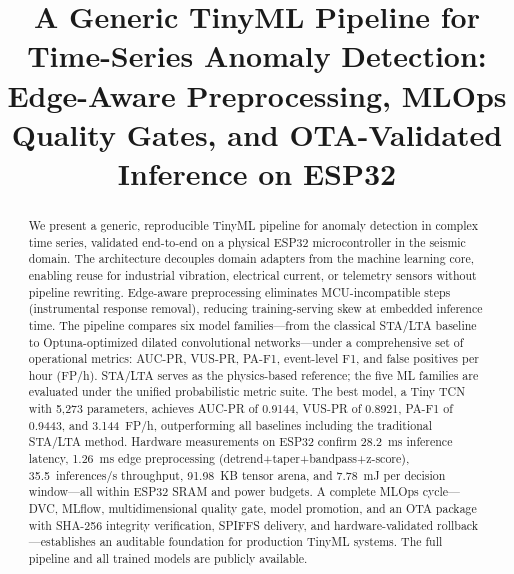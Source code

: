 \documentclass[conference]{IEEEtran}
\def\\{}%
\begin{document}
\title{A Generic TinyML Pipeline for Time-Series Anomaly Detection:\\
Edge-Aware Preprocessing, MLOps Quality Gates,\\
and OTA-Validated Inference on ESP32}

\author{
  \IEEEauthorblockA{
    \textit{[Department]}\\
    \textit{[Institution]}\\
    [City, Country]\\
    [email]
  }
}

\maketitle

\begin{abstract}
We present a generic, reproducible TinyML pipeline for anomaly detection
in complex time series, validated end-to-end on a physical ESP32
microcontroller in the seismic domain.
The architecture decouples domain adapters from the machine learning core,
enabling reuse for industrial vibration, electrical current, or telemetry
sensors without pipeline rewriting.
Edge-aware preprocessing eliminates MCU-incompatible steps
(instrumental response removal), reducing training-serving skew at
embedded inference time.
The pipeline compares six model families---from the classical STA/LTA
baseline to Optuna-optimized dilated convolutional networks---under a
comprehensive set of operational metrics: AUC-PR, VUS-PR,
PA-F1, event-level F1, and false positives per hour (FP/h).
STA/LTA serves as the physics-based reference; the five ML families
are evaluated under the unified probabilistic metric suite.
The best model, a Tiny TCN with 5{,}273 parameters, achieves AUC-PR of
0.9144, VUS-PR of 0.8921, PA-F1 of 0.9443, and 3.144~FP/h,
outperforming all baselines including the traditional STA/LTA method.
Hardware measurements on ESP32 confirm 28.2~ms inference latency,
1.26~ms edge preprocessing (detrend+taper+bandpass+z-score),
35.5~inferences/s throughput, 91.98~KB tensor arena, and 7.78~mJ
per decision window---all within ESP32 SRAM and power budgets.
A complete MLOps cycle---DVC, MLflow, multidimensional quality gate,
model promotion, and an OTA package with SHA-256 integrity verification,
SPIFFS delivery, and hardware-validated rollback---establishes an
auditable foundation for production TinyML systems.
The full pipeline and all trained models are publicly available.
\end{abstract}
\end{document}
